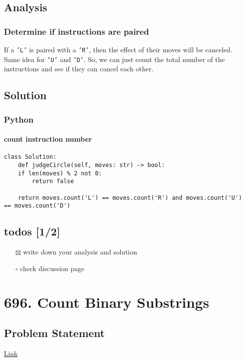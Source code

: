 \documentclass[12pt]{article}
\begin{document}
\subsection{Analysis}
\label{sec:org4dfbf1c}
\subsubsection{Determine if instructions are paired}
\label{sec:org5b7db03}
If a \texttt{'L'} is paired with a \texttt{'R'}, then the effect of their moves will be canceled. Same idea for \texttt{'U'} and \texttt{'D'}. So, we can just count the total number of the instructions and see if they can cancel each other.
\subsection{Solution}
\label{sec:org9c4cbcb}
\subsubsection{Python}
\label{sec:orgf58bb7d}
\paragraph{count instruction number}
\label{sec:orgbe9166f}
\begin{verbatim}
class Solution:
    def judgeCircle(self, moves: str) -> bool:
	if len(moves) % 2 not 0:
	    return false

	return moves.count('L') == moves.count('R') and moves.count('U') == moves.count('D')
\end{verbatim}
\subsection{todos [1/2]}
\label{sec:org715be35}
\begin{itemize}
\item[{$\boxtimes$}] write down your analysis and solution
\item[{$\square$}] check discussion page
\end{itemize}
\section{696. Count Binary Substrings}
\label{sec:orgf8d77f1}
\subsection{Problem Statement}
\label{sec:org3ce13be}
\href{https://leetcode.com/problems/count-binary-substrings/}{Link}
\end{document}
